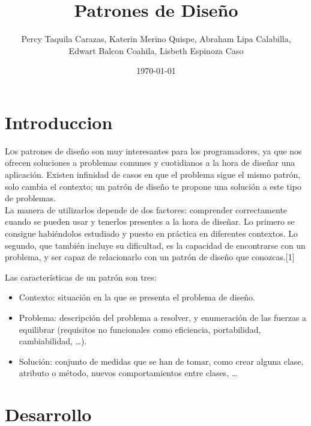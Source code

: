 \documentclass[twoside,twocolumn]{article}
\title{Patrones de Diseño}
\author{Percy Taquila Carazas, Katerin Merino Quispe, Abraham Lipa Calabilla,
\\Edwart Balcon Coahila, Lisbeth Espinoza Caso}
\date{\today}
\begin{document}
\maketitle


\section{Introduccion}

\lettrine[nindent=0em,lines=3]{L}os patrones de diseño son muy interesantes para los programadores, ya que nos ofrecen soluciones a problemas comunes y cuotidianos a la hora de diseñar una aplicación. Existen infinidad de casos en que el problema sigue el mismo patrón, solo cambia el contexto; un patrón de diseño te propone una solución a este tipo de problemas.\\

La manera de utilizarlos depende de dos factores: comprender correctamente cuando se pueden usar y tenerlos presentes a la hora de diseñar. Lo primero se consigue habiéndolos estudiado y puesto en práctica en diferentes contextos. Lo segundo, que también incluye su dificultad, es la capacidad de encontrarse con un problema, y ser capaz de relacionarlo con un patrón de diseño que conozcas.[1]

Las características de un patrón son tres:

\begin{itemize}
\item Contexto: situación en la que se presenta el problema de diseño.
\item Problema: descripción del problema a resolver, y enumeración de las fuerzas a equilibrar (requisitos no funcionales como eficiencia, portabilidad, cambiabilidad, …).
\item Solución: conjunto de medidas que se han de tomar, como crear alguna clase, atributo o método, nuevos comportamientos entre clases, …
\end{itemize}




\section{Desarrollo}
\end{document}
